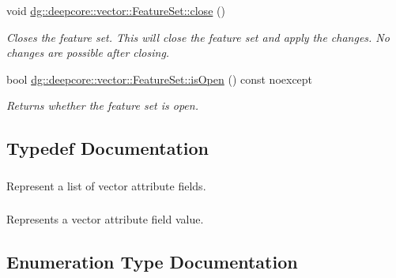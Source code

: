 \begin{DoxyCompactItemize}
void \hyperlink{group___vector_module_gabd53e45c4396d9a6798453b82fb396ac}{dg\+::deepcore\+::vector\+::\+Feature\+Set\+::close} ()
\begin{DoxyCompactList}\small\item\em Closes the feature set. This will close the feature set and apply the changes. No changes are possible after closing. \end{DoxyCompactList}\item 
bool \hyperlink{group___vector_module_ga452851f214ba915b11acdac63fe3d6ba}{dg\+::deepcore\+::vector\+::\+Feature\+Set\+::is\+Open} () const noexcept
\begin{DoxyCompactList}\small\item\em Returns whether the feature set is open. \end{DoxyCompactList}\end{DoxyCompactItemize}


\subsection{Typedef Documentation}
\subsubsection[{\texorpdfstring{Fields}{Fields}}]{}\hypertarget{group___vector_module_gabeca0d4b0cbea4335ae890255ca59128}{}\label{group___vector_module_gabeca0d4b0cbea4335ae890255ca59128}


Represent a list of vector attribute fields. 

\subsubsection[{\texorpdfstring{Field\+Value}{FieldValue}}]{}\hypertarget{group___vector_module_ga4b8ce414fd5c655308a07474c35828c0}{}\label{group___vector_module_ga4b8ce414fd5c655308a07474c35828c0}


Represents a vector attribute field value. 



\subsection{Enumeration Type Documentation}
